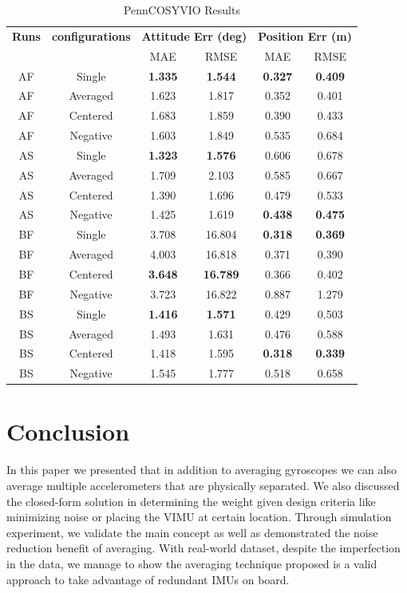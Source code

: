 \documentclass[conference]{IEEEtran}
\begin{document}
\begin{table}[h!]
\centering
\caption{PennCOSYVIO Results}
\label{tab:vio_result}
\begin{tabular}{cccccc}
\toprule
\textbf{Runs} & \textbf{configurations} & \multicolumn{2}{c}{\textbf{Attitude Err (deg)}} & \multicolumn{2}{c}{\textbf{Position Err (m)}} \\
\cmidrule(lr){3-4} \cmidrule(lr){5-6}
 & & MAE & RMSE & MAE & RMSE \\
\midrule
AF & Single   & \textbf{1.335} & \textbf{1.544} & \textbf{0.327} & \textbf{0.409} \\
AF & Averaged & 1.623 & 1.817 & 0.352 & 0.401 \\
AF & Centered & 1.683 & 1.859 & 0.390 & 0.433 \\
AF & Negative & 1.603 & 1.849 & 0.535 & 0.684 \\
\midrule
AS & Single   & \textbf{1.323} & \textbf{1.576} & 0.606 & 0.678 \\
AS & Averaged & 1.709 & 2.103 & 0.585 & 0.667 \\
AS & Centered & 1.390 & 1.696 & 0.479 & 0.533 \\
AS & Negative & 1.425 & 1.619 & \textbf{0.438} & \textbf{0.475} \\
\midrule
BF & Single   & 3.708 & 16.804 & \textbf{0.318} & \textbf{0.369} \\
BF & Averaged & 4.003 & 16.818 & 0.371 & 0.390 \\
BF & Centered & \textbf{3.648} & \textbf{16.789} & 0.366 & 0.402 \\
BF & Negative & 3.723 & 16.822 & 0.887 & 1.279 \\
\midrule
BS & Single   & \textbf{1.416} & \textbf{1.571} & 0.429 & 0.503 \\
BS & Averaged & 1.493 & 1.631 & 0.476 & 0.588 \\
BS & Centered & 1.418 & 1.595 & \textbf{0.318} & \textbf{0.339} \\
BS & Negative & 1.545 & 1.777 & 0.518 & 0.658 \\
\bottomrule
\end{tabular}
\end{table}

\section{Conclusion}

In this paper we presented that in addition to averaging gyroscopes we can also average multiple accelerometers that are physically separated. We also discussed the closed-form solution in determining the weight given design criteria like minimizing noise or placing the VIMU at certain location. Through simulation experiment, we validate the main concept as well as demonstrated the noise reduction benefit of averaging. With real-world dataset, despite the imperfection in the data, we manage to show the averaging technique proposed is a valid approach to take advantage of redundant IMUs on board.



\end{document}
